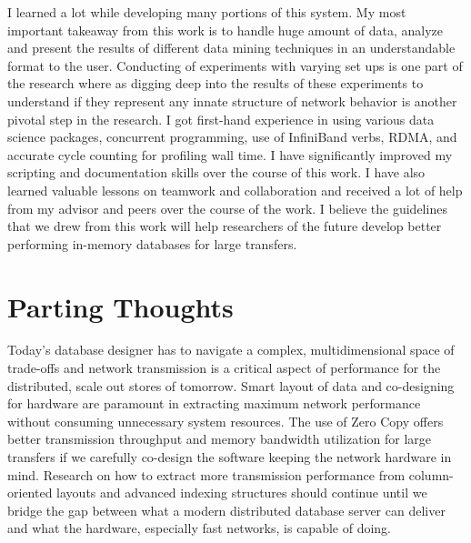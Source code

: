 I learned a lot while developing many portions of this system. My most important takeaway from this work is to handle huge amount of data, analyze and present the results of different data mining techniques in an understandable format to the user. Conducting of experiments with varying set ups is one part of the research where as digging deep into the results of these experiments to understand if they represent any innate structure of network behavior is another pivotal step in the research. 
I got first-hand experience in using various data science packages,  concurrent programming, use of InfiniBand verbs, RDMA, and accurate cycle counting 
for profiling wall time. I have significantly improved my scripting and documentation skills over the course of this work. 
I have also learned valuable lessons on teamwork and collaboration and received a lot of help from my advisor and peers over the course of the work. I believe the guidelines that we drew from this work will help researchers of the future develop better performing in-memory databases for large transfers. 

\section{Parting Thoughts}
Today's database designer has to navigate a complex, multidimensional space of trade-offs and network transmission 
is a critical aspect of performance for the distributed, scale out stores of tomorrow. Smart layout of data and  
co-designing for hardware are paramount in extracting maximum network performance without consuming 
unnecessary system resources. The use of Zero Copy offers better transmission throughput and memory bandwidth utilization for 
large transfers if we carefully co-design the software keeping the network hardware in mind. Research on how to extract 
more transmission performance from column-oriented layouts and advanced indexing structures should continue until we bridge the 
gap between what a modern distributed database server can deliver and what the hardware, especially fast networks, is capable of doing.